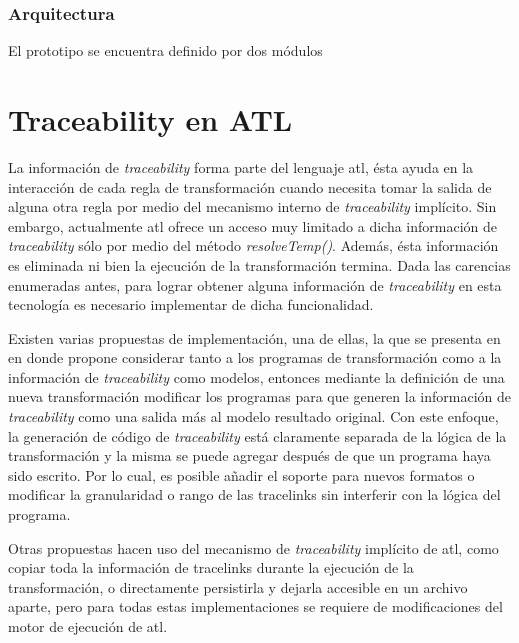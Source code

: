 \documentclass[a4paper,12pt,oneside,spanish]{book}
\begin{document}
\subsubsection{Arquitectura}


El prototipo se encuentra definido por dos módulos


\section{Traceability en ATL}
\label{sec:ATLTtraceability}

La información de \textit{traceability} forma parte del lenguaje \gls{atl}, ésta ayuda en la interacción de cada regla de transformación cuando necesita tomar la salida de alguna otra regla por medio del mecanismo interno de \textit{traceability} implícito. Sin embargo, actualmente \gls{atl} ofrece un acceso muy limitado a dicha información de \textit{traceability} sólo por medio del método \textsf{\textit{resolveTemp()}}. Además, ésta información es eliminada ni bien la ejecución de la transformación termina. Dada las carencias enumeradas antes, para lograr obtener alguna información de \textit{traceability} en esta tecnología es necesario implementar de dicha funcionalidad.

Existen varias propuestas de implementación, una de ellas, la que se presenta en \cite{Jouault} en donde propone considerar tanto a los programas de transformación como a la información de \textit{traceability} como modelos, entonces mediante la definición de una nueva transformación modificar los programas para que generen la información de \textit{traceability} como una salida más al modelo resultado original. Con este enfoque, la generación de código de \textit{traceability} está claramente separada de la lógica de la transformación y la misma se puede agregar después de que un programa haya sido escrito. Por lo cual, es posible añadir el soporte para nuevos formatos o modificar la granularidad o rango de las tracelinks sin interferir con la lógica del programa.

Otras propuestas hacen uso del mecanismo de \textit{traceability} implícito de \gls{atl}, como copiar toda la información de tracelinks durante la ejecución de la transformación, o directamente persistirla y dejarla accesible en un archivo aparte, pero para todas estas implementaciones se requiere de modificaciones del motor de ejecución de \gls{atl}.



\end{document}
